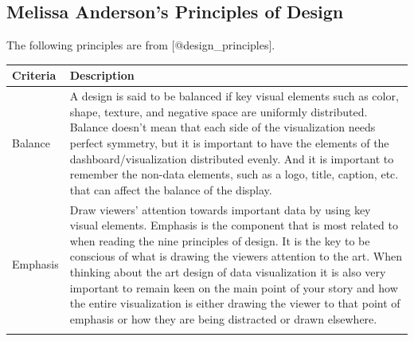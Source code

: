 \documentclass[]{book}
\theoremstyle{definition}
\theoremstyle{definition}
\theoremstyle{definition}
\theoremstyle{remark}
\begin{document}
\subsection{Melissa Anderson's Principles of
Design}\label{melissa-andersons-principles-of-design}

The following principles are from {[}@design\_principles{]}.

\begin{longtable}[]{@{}ll@{}}
\toprule
\begin{minipage}[b]{0.16\columnwidth}\raggedright\strut
\textbf{Criteria}\strut
\end{minipage} & \begin{minipage}[b]{0.78\columnwidth}\raggedright\strut
\textbf{Description}\strut
\end{minipage}\tabularnewline
\midrule
\endhead
\begin{minipage}[t]{0.16\columnwidth}\raggedright\strut
Balance\strut
\end{minipage} & \begin{minipage}[t]{0.78\columnwidth}\raggedright\strut
A design is said to be balanced if key visual elements such as color,
shape, texture, and negative space are uniformly distributed. Balance
doesn't mean that each side of the visualization needs perfect symmetry,
but it is important to have the elements of the dashboard/visualization
distributed evenly. And it is important to remember the non-data
elements, such as a logo, title, caption, etc. that can affect the
balance of the display.\strut
\end{minipage}\tabularnewline
\begin{minipage}[t]{0.16\columnwidth}\raggedright\strut
Emphasis\strut
\end{minipage} & \begin{minipage}[t]{0.78\columnwidth}\raggedright\strut
Draw viewers' attention towards important data by using key visual
elements. Emphasis is the component that is most related to when reading
the nine principles of design. It is the key to be conscious of what is
drawing the viewers attention to the art. When thinking about the art
design of data visualization it is also very important to remain keen on
the main point of your story and how the entire visualization is either
drawing the viewer to that point of emphasis or how they are being
distracted or drawn elsewhere.\strut
\end{minipage}\tabularnewline
\begin{minipage}[t]{0.16\columnwidth}\raggedright\strut

\end{minipage}
\end{longtable}
\end{document}
